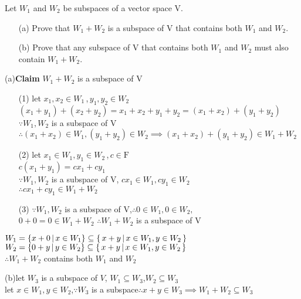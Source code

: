 Let $W_1$ and $W_2$ be subspaces of a vector space $\mathrm{V}$.

\begin{enumerate}
	\item[(a)] Prove that $W_1 + W_2$ is a subspace of $\mathrm{V}$ that contains both $W_1$ and $W_2$. 
	\item[(b)] Prove that any subspace of $\mathrm{V}$ that contains both $W_1$ and $W_2$ must also contain $W_1 + W_2$.
\end{enumerate}

\begin{tcolorbox}
	\begin{solution}
		$ $\\
		(a)\textbf{Claim} $W_1+W_2$ is a subspace of V
		\begin{enumerate}
			\item[(1)] let $x_1,x_2 \in W_1$\,,\,$y_1,y_2 \in W_2$\\
			$(x_1+y_1)+(x_2+y_2) = x_1 +x_2 + y_1+ y_2 = (x_1 +x_2) + (y_1+ y_2)$\\
			$\because W_1,W_2$ is a subspace of V\\
			$\therefore (x_1+x_2) \in W_1 , (y_1+y_2) \in W_2 \implies (x_1 + x_2)+(y_1+y_2) \in W_1 + W_2$
			\item[(2)] let $x_1 \in W_1 , y_1 \in W_2$\,,\,$c \in \mathrm{F}$\\
			$c(x_1+y_1) = cx_1+cy_1$\\
			$\because W_1,W_2$ is a subspace of V, $cx_1 \in W_1, cy_1 \in W_2 $\\
			$\therefore cx_1+cy_1 \in W_1 + W_2$
			\item[(3)] $\because W_1, W_2$ is a subspace of V,$\therefore 0\in W_1, 0 \in W_2,$\\
			$0+0 = 0 \in W_1 + W_2$
			$\therefore W_1+W_2$ is a subspace of V
		\end{enumerate}
		
		$W_1 = \{x+0 \,|\, x \in W_1\} \subseteq \left\{ \,x+y \,|\, x \in W_1 , y \in W_2 \,\right\}$\\
		$W_2 = \{0+y \,|\, y \in W_2\} \subseteq \left\{ \,x+y \,|\, x \in W_1 , y \in W_2 \,\right\}$\\
		$\therefore W_1 + W_2$ contains both $W_1$ and $W_2$
		
		(b)let $W_3$ is a subspace of $V$,
		$W_1 \subseteq W_3$,$W_2 \subseteq W_3$\\
		
		let $x \in W_1, y \in W_2$,$\because W_3$ is a subspace$\therefore x+y \in W_3 \implies W_1 + W_2 \subseteq W_3$
	\end{solution}	
\end{tcolorbox}

